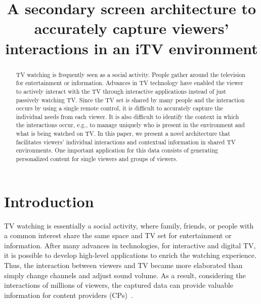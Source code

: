 \documentclass[conference,a4paper]{IEEEtran}
\begin{document}
\title{A secondary screen architecture to accurately capture viewers' interactions in an iTV environment}

\author{
\and
{}
}
\maketitle

\begin{abstract}
TV watching is frequently seen as a social activity. People gather around the television for entertainment or information. Advances in TV technology have enabled the viewer to actively interact with the TV through interactive applications instead of just passively watching TV. Since the TV set is shared by many people and the interaction occurs by using a single remote control, it is difficult to accurately capture the individual needs from each viewer. It is also difficult to identify the context in which the interactions occur, e.g., to manage uniquely who is present in the environment and what is being watched on TV. In this paper, we present a novel architecture that facilitates viewers' individual interactions and contextual information in shared TV environments. One important application for this data consists of generating personalized content for single viewers and groups of viewers.
\end{abstract}

\IEEEpeerreviewmaketitle

\section{Introduction}

TV watching is essentially a social activity, where family, friends, or people with a common interest share the same space and TV set for entertainment or information. After many advances in technologies, for interactive and digital TV, it is possible to develop high-level applications to enrich the watching experience. Thus, the interaction between viewers and TV became more elaborated than simply change channels and adjust sound volume. As a result, considering the interactions of millions of viewers, the captured data can provide valuable information for content providers (CPs)~\cite{Teixeira2010}. 
\end{document}
